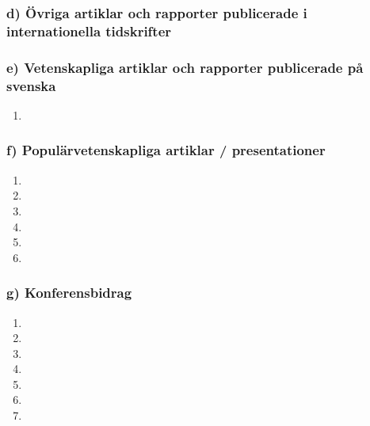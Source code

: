 \subsubsection*{\textsf{d) Övriga artiklar och rapporter publicerade i internationella tidskrifter}}
\subsubsection*{\textsf{e) Vetenskapliga artiklar och rapporter publicerade på svenska}}

\begin{enumerate}
\item {}
\end{enumerate}

\subsubsection*{\textsf{f) Populärvetenskapliga artiklar / presentationer}}


\begin{enumerate}
\item {}

\item  {}

 \item {}

 \item {}

 \item {}

 \item {}
\end{enumerate}


\subsubsection*{\textsf{g) Konferensbidrag }}


\begin{enumerate}
\item {}

\item  {}

\item  {}

\item  {}

\item  {}

\item  {}

\item  {}
\end{enumerate}



